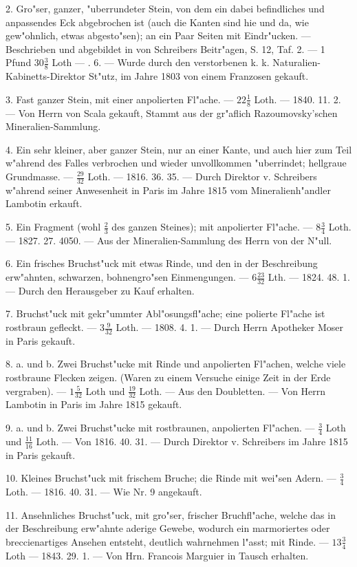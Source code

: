 \documentclass[a4paper, 11pt, oneside, polutonikogreek, german]{article}
\begin{document}
2. Gro"ser, ganzer, "uberrundeter Stein, von dem ein dabei befindliches und anpassendes Eck abgebrochen ist (auch die Kanten sind hie und da, wie gew"ohnlich, etwas abgesto"sen); an ein Paar Seiten mit Eindr"ucken. --- Beschrieben und abgebildet in von Schreibers Beitr"agen, S. 12, Taf. 2. --- 1 Pfund $30\frac{3}{8}$ Loth --- . 6. --- Wurde durch den verstorbenen k. k. Naturalien-Kabinetts-Direktor St"utz, im Jahre 1803 von einem Franzosen gekauft.

3. Fast ganzer Stein, mit einer anpolierten Fl"ache. --- $22\frac{1}{8}$ Loth. --- 1840. 11. 2. --- Von Herrn von Scala gekauft, Stammt aus der gr"aflich Razoumovsky'schen Mineralien-Sammlung.

4. Ein sehr kleiner, aber ganzer Stein, nur an einer Kante, und auch hier zum Teil w"ahrend des Falles verbrochen und wieder unvollkommen "uberrindet; hellgraue Grundmasse. --- $\frac{29}{32}$ Loth. --- 1816. 36. 35. --- Durch Direktor v. Schreibers w"ahrend seiner Anwesenheit in Paris im Jahre 1815 vom Mineralienh"andler Lambotin erkauft.

5. Ein Fragment (wohl $\frac{2}{3}$ des ganzen Steines); mit anpolierter Fl"ache. --- $8\frac{3}{4}$ Loth. --- 1827. 27. 4050. --- Aus der Mineralien-Sammlung des Herrn von der N"ull.

6. Ein frisches Bruchst"uck mit etwas Rinde, und den in der Beschreibung erw"ahnten, schwarzen, bohnengro"sen Einmengungen. --- $6\frac{23}{32}$ Lth. --- 1824. 48. 1. --- Durch den Herausgeber zu Kauf erhalten.

7. Bruchst"uck mit gekr"ummter Abl"osungsfl"ache; eine polierte Fl"ache ist rostbraun gefleckt. --- $3\frac{9}{32}$ Loth. --- 1808. 4. 1. --- Durch Herrn Apotheker Moser in Paris gekauft.

8. a. und b. Zwei Bruchst"ucke mit Rinde und anpolierten Fl"achen, welche viele rostbraune Flecken zeigen. (Waren zu einem Versuche einige Zeit in der Erde vergraben). --- $1\frac{5}{32}$ Loth und $\frac{19}{32}$ Loth. --- Aus den Doubletten. --- Von Herrn Lambotin in Paris im Jahre 1815 gekauft.

9. a. und b. Zwei Bruchst"ucke mit rostbraunen, anpolierten Fl"achen. --- $\frac{3}{4}$ Loth und $\frac{11}{16}$ Loth. --- Von 1816. 40. 31. --- Durch Direktor v. Schreibers im Jahre 1815 in Paris gekauft.

10. Kleines Bruchst"uck mit frischem Bruche; die Rinde mit wei"sen Adern. --- $\frac{3}{4}$ Loth. --- 1816. 40. 31. --- Wie Nr. 9 angekauft.

11. Ansehnliches Bruchst"uck, mit gro"ser, frischer Bruchfl"ache, welche das in der Beschreibung erw"ahnte aderige Gewebe, wodurch ein marmoriertes oder breccienartiges Ansehen entsteht, deutlich wahrnehmen l"asst; mit Rinde. --- $13\frac{3}{4}$ Loth --- 1843. 29. 1. --- Von Hrn. Francois Marguier in Tausch erhalten.
\end{document}
